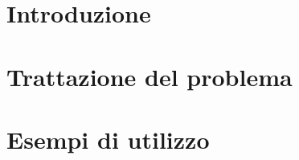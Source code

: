 \documentclass[%
	corpo=11pt,
    twoside,
    stile=classica,
    oldstyle,
    tipotesi=custom,
    greek,
    evenboxes,
]{toptesi}
\begin{document}
\mainmatter

\newpage
\chapter{Introduzione}



\newpage
\chapter{Trattazione del problema}


\newpage
\chapter{Esempi di utilizzo}




\end{document}
